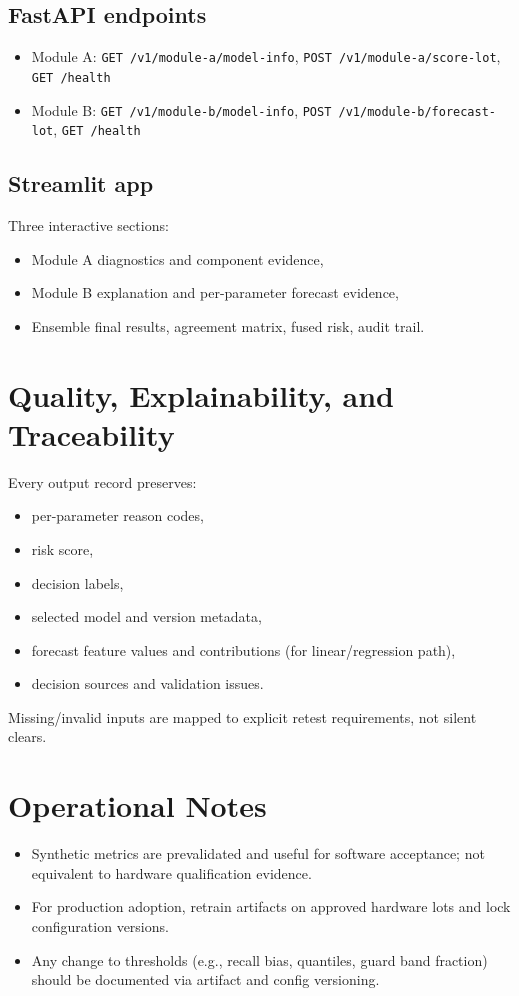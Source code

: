\documentclass[11pt]{article}
\begin{document}
\subsection{FastAPI endpoints}
\begin{itemize}[nosep]
  \item Module A: \texttt{GET /v1/module-a/model-info}, \texttt{POST /v1/module-a/score-lot}, \texttt{GET /health}
  \item Module B: \texttt{GET /v1/module-b/model-info}, \texttt{POST /v1/module-b/forecast-lot}, \texttt{GET /health}
\end{itemize}

\subsection{Streamlit app}
Three interactive sections:
\begin{itemize}[nosep]
  \item Module A diagnostics and component evidence,
  \item Module B explanation and per-parameter forecast evidence,
  \item Ensemble final results, agreement matrix, fused risk, audit trail.
\end{itemize}

\section{Quality, Explainability, and Traceability}

Every output record preserves:
\begin{itemize}[nosep]
  \item per-parameter reason codes,
  \item risk score,
  \item decision labels,
  \item selected model and version metadata,
  \item forecast feature values and contributions (for linear/regression path),
  \item decision sources and validation issues.
\end{itemize}
Missing/invalid inputs are mapped to explicit retest requirements, not silent clears.

\section{Operational Notes}
\begin{itemize}[nosep]
  \item Synthetic metrics are prevalidated and useful for software acceptance; not equivalent to hardware qualification evidence.
  \item For production adoption, retrain artifacts on approved hardware lots and lock configuration versions.
  \item Any change to thresholds (e.g., recall bias, quantiles, guard band fraction) should be documented via artifact and config versioning.
\end{itemize}
\end{document}
